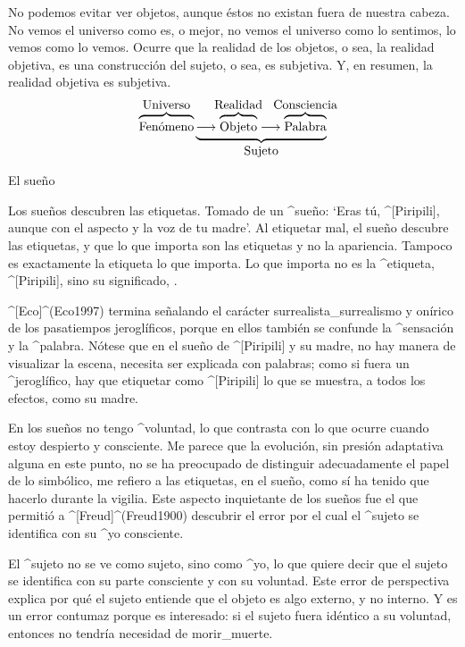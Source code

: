 No podemos evitar ver objetos, aunque éstos no existan fuera de nuestra
cabeza. No vemos el universo como es, o mejor, no vemos el universo como
lo sentimos, lo vemos como lo vemos. Ocurre que la realidad de los
objetos, o sea, la realidad objetiva, es una construcción del sujeto, o
sea, es subjetiva. Y, en resumen, la realidad objetiva es subjetiva.
$$\overbrace{\hbox{\strut Fenómeno}}^{\hbox{Universo}}
 \underbrace{\longrightarrow
  \overbrace{\hbox{\strut Objeto}}^{\hbox to0pt{\hss Realidad\hss}}
  \longrightarrow
  \overbrace{\hbox{\strut Palabra}}^{\hbox to 0pt{\hss
   Consciencia\hss}}}_{\hbox{Sujeto}}$$


\Section El sueño

Los sueños descubren las etiquetas. Tomado de un ^{sueño}: `Eras tú,
^[Piripili], aunque con el aspecto y la voz de tu madre'. Al etiquetar
mal, el sueño descubre las etiquetas, y que lo que importa son las
etiquetas y no la apariencia. Tampoco es exactamente la etiqueta lo que
importa. Lo que importa no es la ^{etiqueta}, ^[Piripili], sino su
significado, .

^[Eco]^(Eco1997) termina señalando el carácter surrealista_{surrealismo}
y onírico de los pasatiempos jeroglíficos, porque en ellos también se
confunde la ^{sensación} y la ^{palabra}. Nótese que en el sueño de
^[Piripili] y su madre, no hay manera de visualizar la escena, necesita
ser explicada con palabras; como si fuera un ^{jeroglífico}, hay que
etiquetar como ^[Piripili] lo que se muestra, a todos los efectos, como
su madre.

En los sueños no tengo ^{voluntad}, lo que contrasta con lo que ocurre
cuando estoy despierto y consciente. Me parece que la evolución, sin
presión adaptativa alguna en este punto, no se ha preocupado de
distinguir adecuadamente el papel de lo simbólico, me refiero a las
etiquetas, en el sueño, como sí ha tenido que hacerlo durante la
vigilia. Este aspecto inquietante de los sueños fue el que permitió a
^[Freud]^(Freud1900) descubrir el error por el cual el ^{sujeto} se
identifica con su ^{yo} consciente.

El ^{sujeto} no se ve como sujeto, sino como ^{yo}, lo que quiere decir
que el sujeto se identifica con su parte consciente y con su voluntad.
Este error de perspectiva explica por qué el sujeto entiende que el
objeto es algo externo, y no interno. Y es un error contumaz porque es
interesado: si el sujeto fuera idéntico a su voluntad, entonces no
tendría necesidad de morir_{muerte}.



